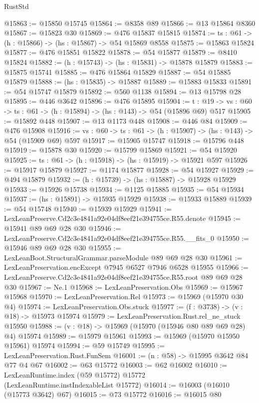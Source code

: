 \begin{lexlean}{RustStd}
\begin{coremodule}
@15863 := @15850 @15745
@15864 := @8358 @89
@15866 := @13 @15864 @8360
@15867 := @15823 @30
@15869 := @476 @15837 @15815
@15874 := {ts : @61} -> (h : @15866) -> (hs : @15867) -> @54 @15869 @8558
@15875 := @15863 @15824
@15877 := @476 @15851 @15822
@15878 := @54 @15877
@15879 := @8410 @15824
@15882 := (h : @15743) -> (hs : @15831) -> @15878 @15879
@15883 := @15875 @15741
@15885 := @476 @15864 @15829
@15887 := @54 @15885 @15879
@15888 := (hs : @15835) -> @15887
@15889 := @15883 @15833
@15891 := @54 @15747 @15879
@15892 := @560 @1138
@15894 := @13 @15798 @28
@15895 := @446 @3642
@15896 := @476 @15895
@15904 := {t : @19} ->
  {vs : @60} -> {ts : @61} -> (h : @15894) -> (hs : @143) -> @54 (@15896 @69) @517
@15905 := @15892 @448
@15907 := @13 @1173 @448
@15908 := @446 @84
@15909 := @476 @15908
@15916 := {vs : @60} -> {ts : @61} -> (h : @15907) -> (hs : @143) -> @54 (@15909 @69) @597
@15917 := @15905 @15747
@15918 := @15796 @448
@15919 := @15878 @30
@15920 := @15799 @15869
@15921 := @54 @15920
@15925 := {ts : @61} -> (h : @15918) -> (hs : @15919) -> @15921 @597
@15926 := @15917 @15879
@15927 := @1174 @15877
@15928 := @54 @15927
@15929 := @494 @15879
@15932 := (h : @15739) -> (hs : @15887) -> @15928 @15929
@15933 := @15926 @15738
@15934 := @1125 @15885
@15935 := @54 @15934
@15937 := (hs : @15891) -> @15935 @15929
@15938 := @15933 @15889
@15939 := @54 @15748
@15940 := @15939 @15929
@15941 := LexLeanPreserve.Cd2c3e4841a92e04df8eef21e394755ce.R55.denote
@15945 := @15941 @89 @69 @28 @30
@15946 := LexLeanPreserve.Cd2c3e4841a92e04df8eef21e394755ce.R55.__fits_0
@15950 := @15946 @89 @69 @28 @30
@15955 := LexLeanBoot.StructuralGrammar.parseModule @89 @69 @28 @30
@15961 := LexLeanPreservation.encExcept @7945 @6527 @7946 @6528 @15955
@15966 := LexLeanPreserve.Cd2c3e4841a92e04df8eef21e394755ce.R55.root @89 @69 @28 @30
@15967 := Ne.{1}
@15968 := LexLeanPreservation.Obs
@15969 := @15967 @15968
@15970 := LexLeanPreservation.Rel
@15973 := @15969 (@15970 @30 @4)
@15974 := LexLeanPreservation.Obs.stuck
@15977 := (f : @3738) -> (v : @18) -> @15973 @15974
@15979 := LexLeanPreservation.Rust.rel_ne_stuck @15950
@15988 := (v : @18) -> @15969 (@15970 (@15946 @80 @89 @69 @28) @4) @15974
@15989 := @15979 @15961
@15993 := @15969 (@15970 @15950 @15961) @15974
@15994 := @59 @15749
@15995 := LexLeanPreservation.Rust.FunSem
@16001 := (n : @58) -> @15995 @3642 @84 @77 @4 @67
@16002 := @63 @15772
@16003 := @62 @16002
@16010 := LexLeanRuntime.index (@59 @15772) @15772 (LexLeanRuntime.instIndexableList @15772)
@16014 := @16003 (@16010 (@15773 @3642) @67)
@16015 := @73 @15772
@16016 := @16015 @80

\end{coremodule}
\end{lexlean}
